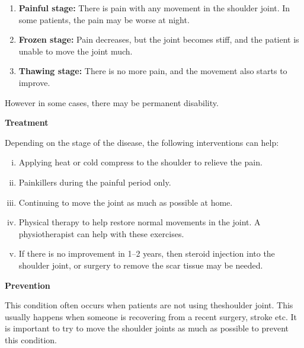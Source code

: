 \begin{enumerate}
\itemsep=0pt
\item \textbf{Painful stage:} There is pain with any movement in the shoulder joint. In some patients, the pain may be worse at night.
\item \textbf{Frozen stage:} Pain decreases, but the joint becomes stiff, and the patient is unable to move the joint much.
\item \textbf{Thawing stage:} There is no more pain, and the movement also starts to improve.
\end{enumerate}


\noindent However in some cases, there may be permanent disability.

\clearpage
\noindent\textbf{Treatment}

\noindent Depending on the stage of the disease, the following interventions can help:

\begin{enumerate}[i.]
\itemsep=0pt
\item Applying heat or cold compress to the shoulder to relieve the pain.
\item Painkillers during the painful period only.
\item Continuing to move the joint as much as possible at home.
\item Physical therapy to help restore normal movements in the joint. A physiotherapist can help with these exercises.
\item If there is no improvement in 1–2 years, then steroid injection into the shoulder joint, or surgery to remove the scar tissue may be needed.
\end{enumerate}

\noindent\textbf{Prevention}

This condition often occurs when patients are not using the\break shoulder joint. This usually happens when someone is recovering from a recent surgery, stroke etc. It is important to try to move the shoulder joints as much as possible to prevent this condition.


